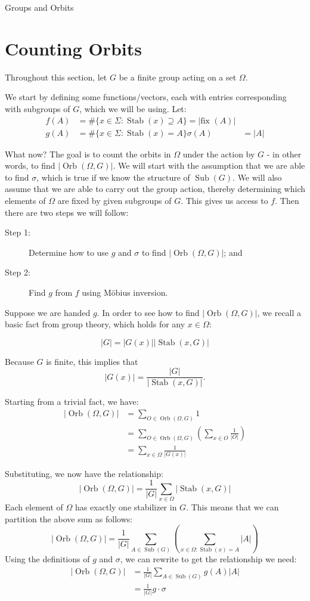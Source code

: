 \documentclass[12pt]{pom_thesis}
\newcommand{\fix}{\text{fix }}
\DeclareMathOperator{\sub}{Sub}
\DeclareMathOperator{\stab}{Stab}
\DeclareMathOperator{\orb}{Orb}
\begin{document}
\begin{chapter}{Groups and Orbits}
\section{Counting Orbits}
Throughout this section, let $G$ be a finite group acting on a set $\Omega$.

We start by defining some functions/vectors, each with entries corresponding with subgroups of $G$, which we will be using. Let:
\begin{align*}
f(A) &= \#\{x \in \Sigma: \stab(x) \supseteq A\} = |\fix(A)|\\
g(A) &= \#\{x \in \Sigma: \stab(x) = A\}
\sigma(A) &= |A|
\end{align*}

What now? The goal is to count the orbits in $\Omega$ under the action by $G$ - in other words, to find $|\orb(\Omega, G)|$. We will start with the assumption that we are able to find $\sigma$, which is true if we know the structure of $\sub(G)$. We will also assume that we are able to carry out the group action, thereby determining which elements of $\Omega$ are fixed by given subgroups of $G$. This gives us access to $f$. Then there are two steps we will follow:
\begin{description}
\item[Step 1:] Determine how to use $g$ and $\sigma$ to find $|\orb(\Omega, G)|$; and
\item[Step 2:] Find $g$ from $f$ using M\"obius inversion.
\end{description}

Suppose we are handed $g$. In order to see how to find $|\orb(\Omega, G)|$, we recall a basic fact from group theory, which holds for any $x \in \Omega$:
\begin{fact}
\[|G| = |G(x)||\stab(x, G)|\]
\end{fact}
Because $G$ is finite, this implies that \[|G(x)| = \frac{|G|}{|\stab(x, G)|}.\]

Starting from a trivial fact, we have:
\begin{align*}
|\orb(\Omega, G)| &= \sum_{O \in \orb(\Omega, G)}1\\
&= \sum_{O \in \orb(\Omega, G)}\left(\sum_{x \in O}\frac{1}{|O|}\right)\\
&= \sum_{x \in \Omega}\frac{1}{|G(x)|}
\end{align*}

Substituting, we now have the relationship:
\[
|\orb(\Omega, G)| = \frac{1}{|G|}\sum_{x \in \Omega}|\stab(x, G)|
\]
Each element of $\Omega$ has exactly one stabilizer in $G$. This means that we can partition the above sum as follows:
\[
|\orb(\Omega, G)| = \frac{1}{|G|}\sum_{A \in \sub(G)}\left(\sum_{x \in \Omega: \stab(x) = A}|A|\right)
\]
Using the definitions of $g$ and $\sigma$, we can rewrite to get the relationship we need:
\begin{align*}
|\orb(\Omega, G)| &= \frac{1}{|G|}\sum_{A \in \sub(G)}g(A)|A|\\
&= \frac {1}{|G|}g \cdot \sigma
\end{align*}


\end{chapter}
\end{document}
